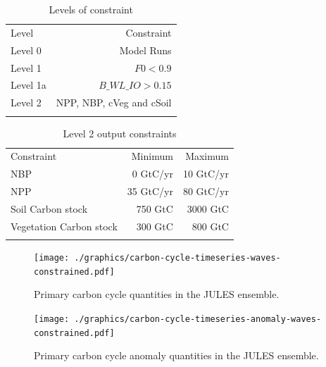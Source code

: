 \documentclass[gmd, manuscript]{copernicus}
\begin{document}

\begin{table}[t]
\caption{Levels of constraint}
\label{table:levels_of_constraint}
\begin{tabular}{l r}
\tophline
Level & Constraint  \\ 
\middlehline
Level 0  & Model Runs \\
Level 1 & $F0 < 0.9$ \\
Level 1a & $B\_WL\_IO > 0.15 $ \\ 
Level 2  & NPP, NBP, cVeg and cSoil \\

\bottomhline
\end{tabular}
\belowtable{} %

\end{table}

\begin{table}[t]
\caption{Level 2 output constraints}
\label{table:level_2_constraints}
\begin{tabular}{l r r}
\tophline
Constraint & Minimum & Maximum \\ 
\middlehline
NBP & 0 GtC/yr &  10 GtC/yr\\
NPP & 35 GtC/yr & 80 GtC/yr \\
Soil Carbon stock & 750 GtC &  3000 GtC\\ 
Vegetation Carbon stock & 300 GtC & 800 GtC \\

\bottomhline
\end{tabular}
\belowtable{} %

\end{table}


%
\begin{figure}[t]
\texttt{[image: ./graphics/carbon-cycle-timeseries-waves-constrained.pdf]}
\caption{Primary carbon cycle quantities in the JULES ensemble.}
\label{fig:carbon-cycle-timeseries-waves-constrained}
\end{figure}

%
\begin{figure}[t]
\texttt{[image: ./graphics/carbon-cycle-timeseries-anomaly-waves-constrained.pdf]}
\caption{Primary carbon cycle anomaly quantities in the JULES ensemble.}
\label{fig:carbon-cycle-timeseries-anomaly-waves-constrained}
\end{figure}
\end{document}
